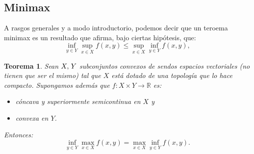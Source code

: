 \documentclass[9pt]{beamer}
\newtheorem{teorema}{Teorema}
\newcommand{\RR}{\mathbb{R}}
\newcommand{\topSpace}{X}
\newcommand{\topSpaceY}{Y}
\begin{document}
	\subsection{Minimax}
	\begin{frame}[fragile]
		A rasgos generales y a modo introductorio, podemos decir que un teroema minimax es un resultado que afirma, bajo ciertas hipótesis, que:
		\[
		\inf_{y \in Y} \sup_{x \in X} f(x,y) \leq \sup_{x \in X} \inf_{y \in Y} f(x,y),
		\] 
		\begin{teorema}\label{MinMax}
			Sean $ \topSpace,\hspace{0.5mm} \topSpaceY $ subconjuntos convexos de sendos espacios vectoriales (no tienen que ser el mismo) tal que $ \topSpace $ está dotado de una topología que lo hace compacto. Supongamos además que $ f:  \topSpace \times \topSpaceY \longrightarrow \RR $ es:
			\begin{itemize}	
				\item[i)] cóncava y superiormente semicontinua en $ \topSpace $ y
				\item[ii)] convexa en $ \topSpaceY $.
			\end{itemize}
			Entonces:
			\begin{equation*}\label{eqMinMax}
			\inf_{y \in Y} \max_{x \in X} f(x,y) = \max_{x \in X} \inf_{y \in Y} f(x,y).
			\end{equation*}
		\end{teorema}
	\end{frame}
\end{document}
